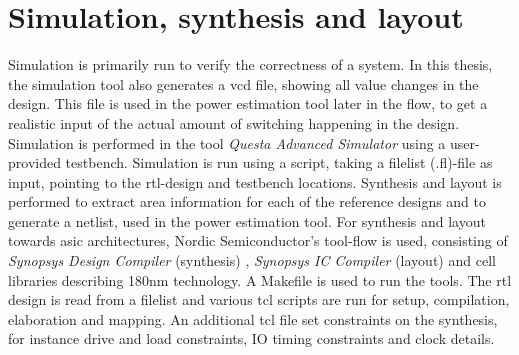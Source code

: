 \section{Simulation, synthesis and layout}
Simulation is primarily run to verify the correctness of a system. In this thesis, the simulation tool also generates a \gls{vcd} file, showing all value changes in the design. This file is used in the power estimation tool later in the flow, to get a realistic input of the actual amount of switching happening in the design. Simulation is performed in the tool \textit{Questa Advanced Simulator} \cite{questasim} using a user-provided testbench. Simulation is run using a script, taking a filelist (.fl)-file as input, pointing to the \gls{rtl}-design and testbench locations. Synthesis and layout is performed to extract area information for each of the reference designs and to generate a netlist, used in the power estimation tool. For synthesis and layout towards \gls{asic} architectures, Nordic Semiconductor's tool-flow is used, consisting of \textit{Synopsys Design Compiler} (synthesis) \cite{syndescomp}, \textit{Synopsys IC Compiler} (layout) \cite{syniccomp} and cell libraries describing 180nm technology. A Makefile is used to run the tools. The \gls{rtl} design is read from a filelist and various \gls{tcl} scripts are run for setup, compilation, elaboration and mapping. An additional \gls{tcl} file set constraints on the synthesis, for instance drive and load constraints, IO timing constraints and clock details.
